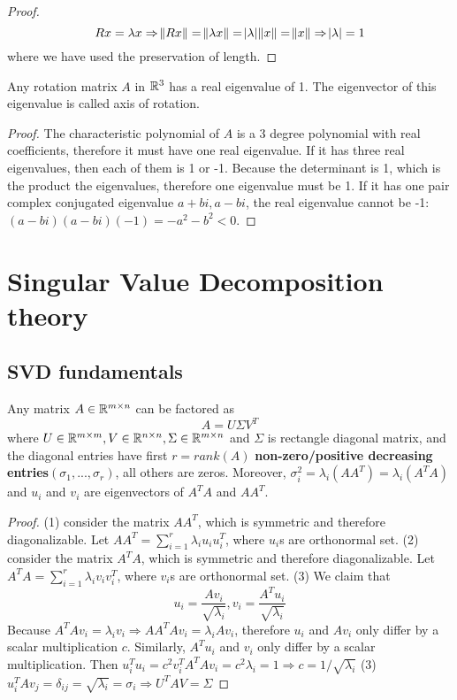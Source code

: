 \begin{refsection}
\begin{proof}
$$Rx = \lambda x \Rightarrow \norm{Rx} = \norm{\lambda x} = \abs{\lambda}\norm{x} = \norm{x} \Rightarrow \abs{\lambda} = 1$$
where we have used the preservation of length.
\end{proof}


\begin{theorem}
Any rotation matrix $A$ in $\mathbb{R}^3$ has a real eigenvalue of 1. The eigenvector of this eigenvalue is called axis of rotation.
\end{theorem}

\begin{proof}
The characteristic polynomial of $A$ is a 3 degree polynomial with real coefficients, therefore it must have one real eigenvalue. If it has three real eigenvalues, then each of them is 1 or -1. Because the determinant is 1, which is the product the eigenvalues, therefore one eigenvalue must be 1. If it has one pair complex conjugated eigenvalue $a+bi,a-bi$, the real eigenvalue cannot be -1: $(a-bi)(a-bi)(-1) = -a^2-b^2 <0$.
\end{proof}





\section{Singular Value Decomposition theory}
\subsection{SVD fundamentals}
\begin{theorem}\label{ch:linearalgebra:th:SVD}
\cite[142]{calafiore2014optimization} Any matrix $A \in \mathbb{R}^{m\times n}$ can be factored as
$$A = U\Sigma V^T$$
where $U\in \mathbb{R}^{m\times m}, V\in \mathbb{R}^{n\times n}, \Sigma \in \mathbb{R}^{m\times n}$ and $\Sigma$ is rectangle diagonal matrix, and the diagonal entries  have first $r = rank(A)$ \textbf{non-zero/positive decreasing entries}$(\sigma_1,...,\sigma_r)$, all others are zeros. Moreover, $\sigma_i^2 = \lambda_i(AA^T) = \lambda_i(A^TA)$ and $u_i$ and $v_i$ are eigenvectors of $A^TA$ and $AA^T$.
\end{theorem}

\begin{proof}
(1) consider the matrix $AA^T$, which is symmetric and therefore diagonalizable. Let $AA^T = \sum_{i=1}^r \lambda_i u_iu_i^T$, where $u_i$s are orthonormal set. (2) consider the matrix $A^TA$, which is symmetric and therefore diagonalizable. Let $A^TA = \sum_{i=1}^r \lambda_i v_iv_i^T$, where $v_i$s are orthonormal set. (3) We claim that $$u_i = \frac{Av_i}{\sqrt{\lambda_i}},v_i = \frac{A^Tu_i}{\sqrt{\lambda_i}}$$
Because $A^TAv_i = \lambda_i v_i \Rightarrow AA^TAv_i = \lambda_i Av_i$, therefore $u_i$ and $Av_i$ only differ by a scalar multiplication $c$. Similarly, $A^Tu_i$ and $v_i$ only differ by a scalar multiplication. Then $u_i^T u_i = c^2 v_i^TA^TAv_i = c^2 \lambda_i = 1 \Rightarrow c = 1/\sqrt{\lambda_i}$
(3) $u_i^TAv_j = \delta_{ij} = \sqrt{\lambda_i} = \sigma_i \Rightarrow U^TAV = \Sigma$
\end{proof}



\end{refsection}
